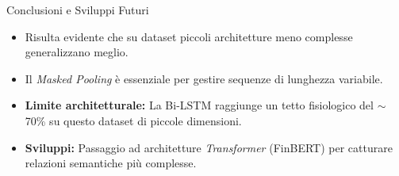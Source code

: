 \documentclass{beamer}
\begin{document}
\begin{frame}{Conclusioni e Sviluppi Futuri}
    \begin{itemize}
        \item Risulta evidente che su dataset piccoli architetture meno complesse generalizzano meglio.
        \item Il \textit{Masked Pooling} è essenziale per gestire sequenze di lunghezza variabile.
        \item \textbf{Limite architetturale:} La Bi-LSTM raggiunge un tetto fisiologico del $\sim$70\% su questo dataset di piccole dimensioni.
        \item \textbf{Sviluppi:} Passaggio ad architetture \textit{Transformer} (FinBERT) per catturare relazioni semantiche più complesse.
    \end{itemize}
\end{frame}
\end{document}
